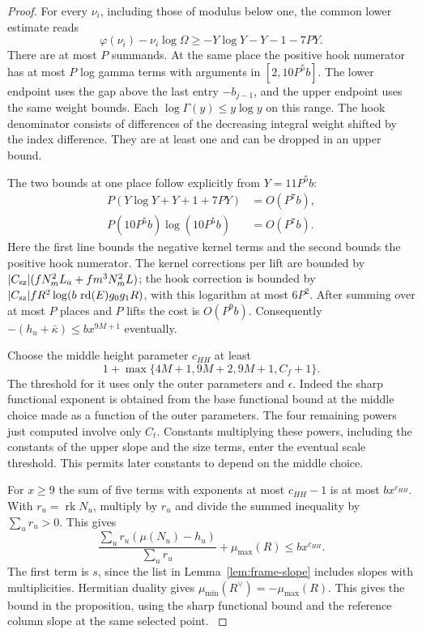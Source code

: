 \begin{proof}
For every \(\nu_i\), including those of modulus below one, the common lower estimate reads
\[
 \varphi(\nu_i)-\nu_i\log\Omega\ge -Y\log Y-Y-1-7PY .
\] There are at most \(P\) summands. At the same place
the positive hook numerator has at most \(P\) log gamma
terms with arguments in \([2,10P^5b]\).
The lower endpoint uses the gap above the last entry
\(-b_{j-1}\), and the upper endpoint uses the same weight
bounds. Each \(\log\Gamma(y)\le y\log y\) on this range.
The hook denominator consists of differences of the decreasing
integral weight shifted by the index difference. They are
at least one and can be dropped in an upper bound.

The two bounds at one place follow explicitly from \(Y=11P^5b\):
\[
 \begin{aligned}
 P(Y\log Y+Y+1+7PY)&=O(P^7b),\\
 P(10P^5b)\log(10P^5b)&=O(P^7b).
 \end{aligned}
\]
Here the first line bounds the negative kernel terms and the second
bounds the positive hook numerator. The kernel
corrections per lift are bounded by
\(|C_{\rm sz}|(f N_m^2 L_a+fm^3 N_m^2 L)\);
the hook correction is bounded by \(|C_{\rm sz}| f R^2
\log(b\,\operatorname{rd}(E)g_0g_1 R)\), with this
logarithm at most \(6P^2\). After summing over at most
\(P\) places and \(P\) lifts the cost is \(O(P^9b)\).
Consequently \(-(h_u+\bar\kappa)\le b x^{9M+1}\)
eventually. \label{cor:frame-height-limit-4}

Choose the middle height parameter \(c_{HH}\) at least
\[
     1+\max\{4M+1,9M+2,9M+1,C_f+1\}.
\]
The threshold for it uses only the outer parameters and
\(\epsilon\). Indeed the sharp functional exponent is
obtained from the base functional bound at the middle choice
made as a function of the outer parameters. The four
remaining powers just computed involve only \(C_t\).
Constants multiplying these powers, including the constants
of the upper slope and the size terms, enter the eventual
scale threshold. This permits later constants to depend
on the middle choice.

For \(x\ge9\) the sum of five terms
with exponents at most \(c_{HH}-1\) is at most \(b x^{c_{HH}}\).
With \(r_u=\operatorname{rk}N_u\), multiply by \(r_u\) and
divide the summed inequality by \(\sum_u r_u>0\). This gives
\[
     \frac{\sum_u r_u(\mu(N_u)-h_u)}{\sum_u r_u}
       +\mu_{\max}(R)\le b x^{c_{HH}}.
\]
The first term is \(s\), since the list in
Lemma~\ref{lem:frame-slope} includes slopes with multiplicities.
Hermitian duality gives \(\mu_{\min}(R^\vee)=-\mu_{\max}(R)\).
This gives the bound in the proposition, using the sharp
functional bound and the reference column slope at the same
selected point. \label{cor:frame-height-limit-5}
\end{proof}
